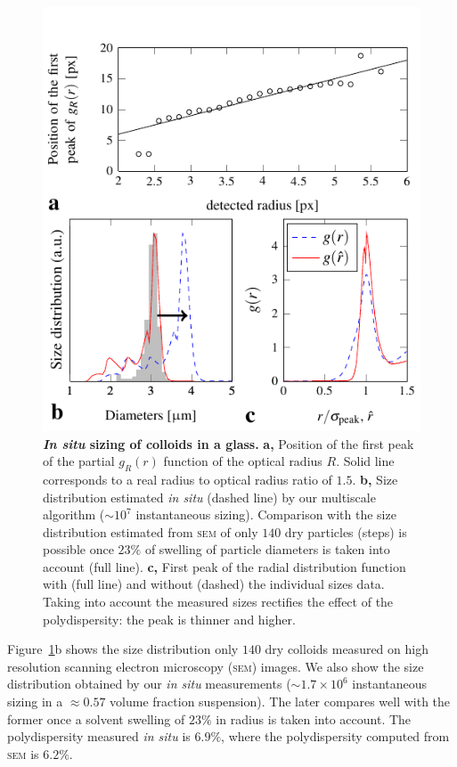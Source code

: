 \documentclass[8.5pt,twoside,twocolumn]{article}
\begin{document}
\begin{figure}
\centering
\includegraphics{fig_sizing.pdf}
	\caption{\textbf{\emph{In situ} sizing of colloids in a glass.} \textbf{a,} Position of the first peak of the partial $g_R(r)$ function of the optical radius $R$. Solid line corresponds to a real radius to optical radius ratio of $1.5$. \textbf{b,} Size distribution estimated \emph{in situ} (dashed line) by our multiscale algorithm ($\sim 10^7$ instantaneous sizing). Comparison with the size distribution estimated from \textsc{sem} of only $140$ dry particles (steps) is possible once $23\%$ of swelling of particle diameters is taken into account (full line). \textbf{c,} First peak of the radial distribution function with (full line) and without (dashed) the individual sizes data. Taking into account the measured sizes rectifies the effect of the polydispersity: the peak is thinner and higher.}
	\label{fig:sizing}
\end{figure}

Figure~\ref{fig:sizing}b shows the size distribution only $140$ dry colloids measured on high resolution scanning electron microscopy (\textsc{sem}) images. We also show the size distribution obtained by our \emph{in situ} measurements ($\sim 1.7\times 10^6$ instantaneous sizing in a $\approx 0.57$ volume fraction suspension). The later compares well with the former once a solvent swelling of $23\%$ in radius is taken into account. The polydispersity measured \emph{in situ} is $6.9\%$, where the polydispersity computed from \textsc{sem} is $6.2\%$.
\end{document}
